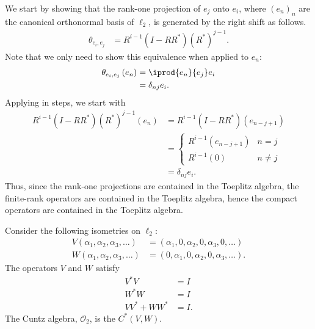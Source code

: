 \documentclass[10pt]{mypackage}
\begin{document}
\begin{solution}
  We start by showing that the rank-one projection of $e_j$ onto $e_i$, where $\left(e_n\right)_n$ are the canonical orthonormal basis of $\ell_2$, is generated by the right shift as follows.
  \begin{align*}
    \theta_{e_i,e_j} &= R^{i-1}\left(I - RR^{\ast}\right)\left(R^{\ast}\right)^{j-1}.
  \end{align*}
  Note that we only need to show this equivalence when applied to $e_n$:
  \begin{align*}
    \theta_{e_i,e_j}\left(e_n\right) &= \iprod{e_n}{e_j}e_i\\
                                     &= \delta_{nj}e_i.
  \end{align*}
  Applying in steps, we start with
  \begin{align*}
    R^{i-1}\left(I-RR^{\ast}\right)\left(R^{\ast}\right)^{j-1}\left(e_n\right) &= R^{i-1}\left(I-RR^{\ast}\right)\left(e_{n-j+1}\right)\\
                                                                               &= \begin{cases}
                                                                                 R^{i-1}\left(e_{n-j+1}\right) & n=j\\
                                                                                 R^{i-1}\left(0\right) & n\neq j
                                                                               \end{cases}\\
                                                                               &= \delta_{nj}e_i.
  \end{align*}
  Thus, since the rank-one projections are contained in the Toeplitz algebra, the finite-rank operators are contained in the Toeplitz algebra, hence the compact operators are contained in the Toeplitz algebra.
\end{solution}
\begin{example}
  Consider the following isometries on $\ell_2$:
  \begin{align*}
    V\left(\alpha_1,\alpha_2,\alpha_3,\dots\right) &= \left(\alpha_1,0,\alpha_2,0,\alpha_3,0,\dots\right)\\
    W\left(\alpha_1,\alpha_2,\alpha_3,\dots\right) &= \left(0,\alpha_1,0,\alpha_2,0,\alpha_3,\dots\right).
  \end{align*}
  The operators $V$ and $W$ satisfy
  \begin{align*}
    V^{\ast}V &= I\\
    W^{\ast}W &= I\\
    VV^{\ast} + WW^{\ast} &= I.
  \end{align*}
  The Cuntz algebra, $\mathcal{O}_2$, is the $C^{\ast}\left(V,W\right)$.
\end{example}
\end{document}
